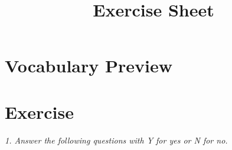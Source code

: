 \documentclass{exam}
\title{Exercise Sheet}
\begin{document}
\section{Vocabulary Preview}

%
%
%
%
%
%
%
%
%
%
%
%
%
%
%
%
%
%
%
%


\newpage


%
%
%
%
%
%
%
%
%
%
%
%
%
%
%
%
%
%
%
%



\newpage
\section{Exercise}

\noindent \textit{1. Answer the following questions with Y for yes or N for no.}

%
%
%
%
%
%
%
%
%
%
%
%
%
%
%
%
%
%
%
%
\end{document}
